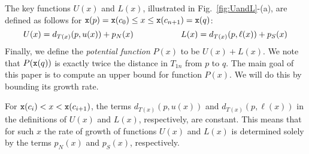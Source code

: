 The key functions $U(x)$ and $L(x)$, illustrated in Fig.~\ref{fig:UandL}-(a), 
are defined as follows for
${\tt x}(p) = {\tt x}(c_0) \leq x \leq {\tt x}(c_{n+1}) = {\tt x}(q)$:
\begin{equation*}
U(x) = d_{T(x)}(p,u(x)) + p_N(x) \mbox{\hspace{2cm}} L(x) = d_{T(x)}(p,\ell(x)) + p_S(x)
\end{equation*}
Finally, we define the {\em potential function} $P(x)$ to be $U(x) + L(x)$. 
We note that
$P({\tt x}(q))$ is exactly twice the distance in $T_{1n}$ from $p$ to $q$. The 
main goal of this paper is to compute an upper bound for function $P(x)$.
We will do this by bounding its growth rate.

For ${\tt x}(c_i) < x < {\tt x}(c_{i+1})$, the terms 
$d_{T(x)}(p,u(x))$ and $d_{T(x)}(p,\ell(x))$ in the definitions of 
$U(x)$ and $L(x)$, respectively, are constant. 
This means that for such $x$ the rate of growth of
functions $U(x)$ and $L(x)$ is determined solely by the terms 
$p_N(x)$ and $p_S(x)$, respectively. 




